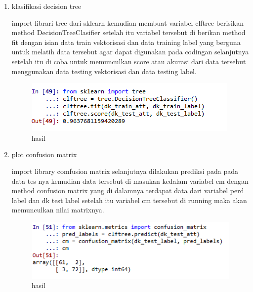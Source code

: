 \begin{enumerate}
\item klasifikasi decision tree

\par import librari tree dari sklearn kemudian membuat variabel clftree berisikan method DecisionTreeClasifier setelah itu variabel tersebut di berikan method fit dengan isian data train vektorisasi dan data training label yang berguna untuk melatih data tersebut agar dapat digunakan pada codingan selanjutnya setelah itu di coba untuk memunculkan score atau akurasi dari data tersebut menggunakan data testing vektorisasi dan data testing label.
\begin{figure}[H]
\centering
\includegraphics[scale=0.7]{figures/1174012/chapter4/10.PNG}
\caption{hasil}
\label{Praktek no 5}
\end{figure}	

\item plot confusion matrix

\par import library comfusion matrix selanjutnya dilakukan prediksi pada pada data tes nya kemudian data tersebut di masukan kedalam variabel cm dengan method confusion matrix yang di dalamnya terdapat data dari variabel perd label dan dk test label setelah itu variabel cm tersebut di running maka akan memunculkan nilai matrixnya. 	
\begin{figure}[H]
\centering
\includegraphics[scale=0.7]{figures/1174012/chapter4/11.PNG}
\caption{hasil}
\label{Praktek no 6}
\end{figure}


\end{enumerate}
